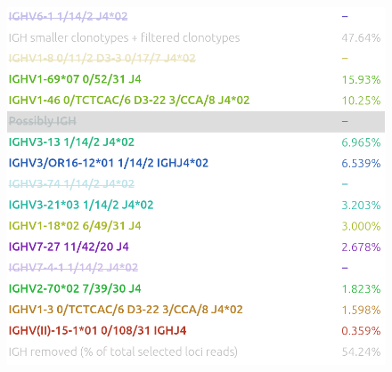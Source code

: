 \begin{figure}[H]
    \begin{minipage}{0.65\textwidth}
        \centering
        \includegraphics[width=1\textwidth]{images/removed_clonotypes.png}
    \end{minipage}
    \hfill
    \begin{minipage}{0.3\textwidth}
        \centering

\end{minipage}
\end{figure}
